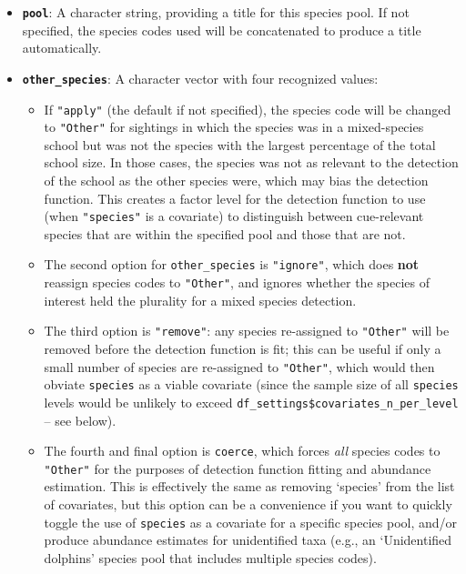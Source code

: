 \documentclass[
]{book}
\providecommand{\tightlist}{%
  \setlength{\itemsep}{0pt}\setlength{\parskip}{0pt}}
\begin{document}
\begin{itemize}
\item
  \textbf{\texttt{pool}}: A character string, providing a title for this species pool. If not specified, the species codes used will be concatenated to produce a title automatically.
\item
  \textbf{\texttt{other\_species}}: A character vector with four recognized values:

  \begin{itemize}
  \tightlist
  \item
    If \texttt{"apply"} (the default if not specified), the species code will be changed to \texttt{"Other"} for sightings in which the species was in a mixed-species school but was not the species with the largest percentage of the total school size. In those cases, the species was not as relevant to the detection of the school as the other species were, which may bias the detection function. This creates a factor level for the detection function to use (when \texttt{"species"} is a covariate) to distinguish between cue-relevant species that are within the specified pool and those that are not.
  \item
    The second option for \texttt{other\_species} is \texttt{"ignore"}, which does \textbf{not} reassign species codes to \texttt{"Other"}, and ignores whether the species of interest held the plurality for a mixed species detection.
  \item
    The third option is \texttt{"remove"}: any species re-assigned to \texttt{"Other"} will be removed before the detection function is fit; this can be useful if only a small number of species are re-assigned to \texttt{"Other"}, which would then obviate \texttt{species} as a viable covariate (since the sample size of all \texttt{species} levels would be unlikely to exceed \texttt{df\_settings\$covariates\_n\_per\_level} -- see below).
  \item
    The fourth and final option is \texttt{coerce}, which forces \emph{all} species codes to \texttt{"Other"} for the purposes of detection function fitting and abundance estimation. This is effectively the same as removing `species' from the list of covariates, but this option can be a convenience if you want to quickly toggle the use of \texttt{species} as a covariate for a specific species pool, and/or produce abundance estimates for unidentified taxa (e.g., an `Unidentified dolphins' species pool that includes multiple species codes).
  \end{itemize}
\end{itemize}
\end{document}
